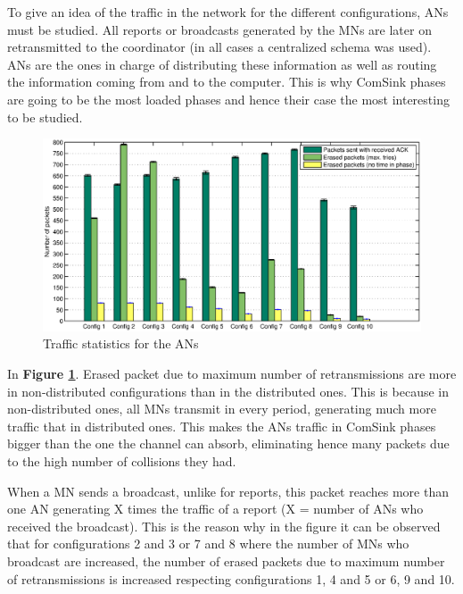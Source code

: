 To give an idea of the traffic in the network for the different configurations, \acp{AN} must be studied. All reports or broadcasts generated by the
\acp{MN} are later on retransmitted to the coordinator (in all cases a centralized schema was used). \acp{AN} are the ones in charge of distributing these
information as well as routing the information coming from and to the computer. This is why ComSink phases are going to be the most loaded
phases and hence their case the most interesting to be studied.

\begin{figure}[ht]
 \begin{center}
  \includegraphics[width=1\textwidth]{packetsSentErasedNoTimeAN.eps}
 \end{center}
 \caption{Traffic statistics for the \acp{AN}}
 \label{fig:packetsSentErasedNoTimeAN}
\end{figure}

In \textbf{Figure \ref{fig:packetsSentErasedNoTimeAN}}. Erased packet due to maximum number of retransmissions are more in non-distributed 
configurations than in the distributed ones. This is because in non-distributed ones, all \acp{MN} transmit in every period, generating much more traffic
that in distributed ones. This makes the \acp{AN} traffic in ComSink phases bigger than the one the channel can absorb, eliminating hence many packets 
due to the high number of collisions they had.

When a \ac{MN} sends a broadcast, unlike for reports, this packet reaches more than one \ac{AN} generating X times the traffic of a report (X = number of \acp{AN}
who received the broadcast). This is the reason why in the figure it can be observed that for configurations 2 and 3 or 7 and 8 where the number of 
\acp{MN} who broadcast are increased, the number of erased packets due to maximum number of retransmissions is increased respecting configurations
1, 4 and 5 or 6, 9 and 10.


